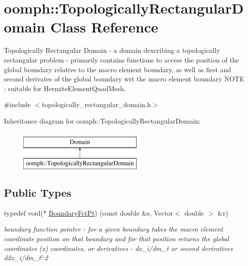 \hypertarget{classoomph_1_1TopologicallyRectangularDomain}{}\section{oomph\+:\+:Topologically\+Rectangular\+Domain Class Reference}
\label{classoomph_1_1TopologicallyRectangularDomain}


Topologically Rectangular Domain -\/ a domain dexcribing a topologically rectangular problem -\/ primarily contains functions to access the position of the global boundary relative to the macro element boundary, as well as first and second derivates of the global boundary wrt the macro element boundary N\+O\+TE \+: suitable for Hermite\+Element\+Quad\+Mesh.  




{\ttfamily \#include $<$topologically\+\_\+rectangular\+\_\+domain.\+h$>$}

Inheritance diagram for oomph\+:\+:Topologically\+Rectangular\+Domain\+:\begin{figure}[H]
\begin{center}
\leavevmode
\includegraphics[height=2.000000cm]{classoomph_1_1TopologicallyRectangularDomain}
\end{center}
\end{figure}
\subsection*{Public Types}
\begin{DoxyCompactItemize}
\item 
typedef void($\ast$ \hyperlink{classoomph_1_1TopologicallyRectangularDomain_a8b2e24f5500d86c93aef509c5410e7cc}{Boundary\+Fct\+Pt}) (const double \&s, Vector$<$ double $>$ \&r)
\begin{DoxyCompactList}\small\item\em boundary function pointer -\/ for a given boundary takes the macro element coordinate position on that boundary and for that position returns the global coordinates (x) coordinates, or derivatives -\/ dx\+\_\+i/dm\+\_\+t or second derivatives d2x\+\_\+i/dm\+\_\+t$^\wedge$2 \end{DoxyCompactList}\end{DoxyCompactItemize}
